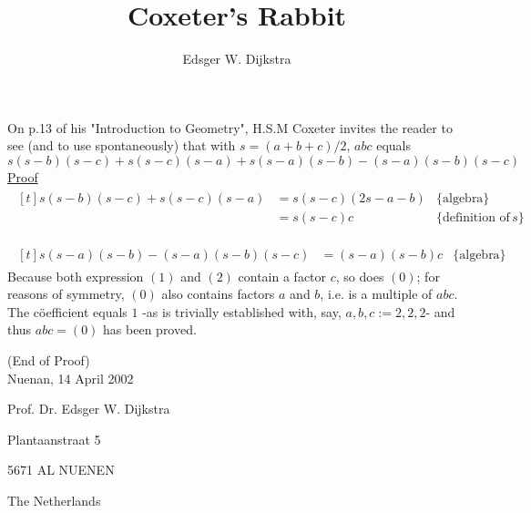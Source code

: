\documentclass[a4paper,11pt, leqno]{article}
\title{Coxeter's Rabbit}
\author{Edsger W. Dijkstra}
\date{}
\begin{document}
\maketitle
 On p.13 of his "Introduction to Geometry", H.S.M Coxeter invites the reader to see (and to use spontaneously) that with $s = (a+b+c)/2$, $abc$ equals
\begin{equation}
s(s-b)(s-c) + s(s-c)(s-a) + s(s-a)(s-b) - (s-a)(s-b)(s-c)
\end{equation}
\underline{Proof}
\begin{align}
\begin{aligned}[t]
s(s-b)(s-c) + s(s-c)(s-a) &= s(s-c)(2s - a-b)  &\text{\{algebra\}}\\
&= s(s-c)c  &\text{\{definition of }s\}
\end{aligned}
\end{align}

\begin{align}
\begin{aligned}[t]
s(s-a)(s-b) - (s-a)(s-b)(s-c) &= (s-a)(s-b)c  &\text{\{algebra\}}
\end{aligned}
\end{align}
Because both expression $(1)$ and $(2)$ contain a factor $c$, so does $(0)$; for reasons of symmetry, $(0)$ also contains factors $a$ and $b$, i.e. is a multiple of $abc$. The c\"oefficient equals $1$ -as is trivially established with, say, $a,b,c := 2,2,2$- and thus $abc = (0)$ has been proved.

\begin{flushright}
(End of Proof)\\[4pt]

Nuenan, 14 April 2002
\end{flushright}

Prof. Dr. Edsger W. Dijkstra

Plantaanstraat 5

5671 AL NUENEN

The Netherlands
\end{document}
